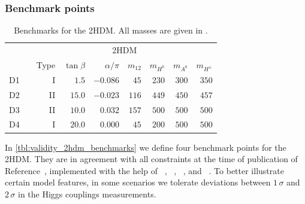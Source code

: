 \subsubsection{Benchmark points}

\begin{table}[t]
  \begin{tabular}{c c rrrrrrr }
    \toprule
    \multirow{2}{*}{} && \multicolumn{7}{c}{2HDM} \\
    \cmidrule{3-9}
    && Type & $\tan\beta$ & $\alpha/\pi$
    & $m_{12} $ & $m_{H^0} $ & $m_{A^0} $ & $m_{H^\pm}$ \\
    \midrule
    D1 && I & $1.5$ & $-0.086$ & $45$ & $230$ & $300$ & $350$ \\
    D2 && II & $15.0$ & $-0.023$ & $116$ & $449$ & $450$ & $457$ \\
    D3 && II & $10.0$ & $0.032$ & $157$ & $500$ & $500$ & $500$ \\
    D4 && I & $20.0$ & $0.000$ & $45$ & $200$ & $500$ & $500$ \\
    \bottomrule
  \end{tabular}
  \caption[Benchmarks for the 2HDM model]{Benchmarks
    for the 2HDM. All masses are given in \gev.}
 \label{tbl:validity_2hdm_benchmarks}
\end{table}

In \autoref{tbl:validity_2hdm_benchmarks} we define four benchmark
points for the 2HDM. They are in agreement with all constraints at the
time of publication of Reference~\cite{Brehmer:2015rna}, implemented with
the help of ~\cite{Eriksson:2009ws},
~\cite{Bechtle:2008jh, Bechtle:2011sb},
~\cite{Mahmoudi:2008tp}, and
~\cite{Bechtle:2013xfa}. To better illustrate
certain model features, in some scenarios we tolerate deviations
between $1\,\sigma$ and $2\,\sigma$ in the Higgs couplings
measurements.


